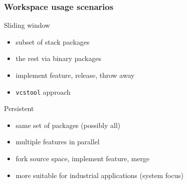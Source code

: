 \documentclass[hyperref={colorlinks=false, breaklinks=true},11pt]{beamer}
\begin{document}
\begin{frame}
    \frametitle{Workspace usage scenarios}

    \begin{block}{Sliding window}
        \begin{itemize}
            \item subset of stack packages
            \item the rest via binary packages
            \item implement feature, release, throw away
            \item \texttt{vcstool} approach
        \end{itemize}
    \end{block}

    \begin{block}{Persistent}
        \begin{itemize}
            \item same set of packages (possibly all)
            \item multiple features in parallel
            \item fork source space, implement feature, merge
            \item more suitable for industrial applications (system focus)
        \end{itemize}
    \end{block}
\end{frame}
\end{document}
